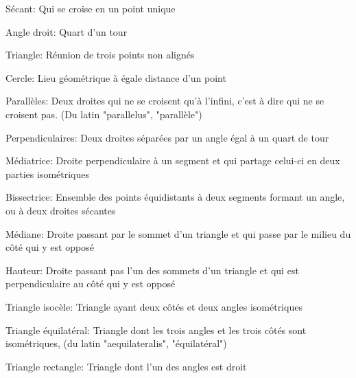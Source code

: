 \begin{definition}{Sécant:}
Qui se croise en un point unique
\end{definition}

\begin{definition}{Angle droit:}
Quart d'un tour
\end{definition}

\begin{definition}{Triangle:}
Réunion de trois points non alignés
\end{definition}

\begin{definition}{Cercle: }
Lieu géométrique à égale distance d'un point
\end{definition}

\begin{definition}{Parallèles:}
Deux droites qui ne se croisent qu'à l'infini, c'est à dire qui ne se croisent pas. (Du latin "parallelus", "parallèle")
\end{definition}

\begin{definition}{Perpendiculaires:}
Deux droites séparées par un angle égal à un quart de tour
\end{definition}

\begin{definition}{Médiatrice:}\label{def:mediatrice}
Droite perpendiculaire à un segment et qui partage celui-ci en deux parties isométriques
\end{definition}

\begin{definition}{Bissectrice:}
Ensemble des points équidistants à deux segments formant un angle, ou à deux droites sécantes
\end{definition}

\begin{definition}{Médiane:}
Droite passant par le sommet d'un triangle et qui passe par le milieu du côté qui y est opposé
\end{definition}

\begin{definition}{Hauteur:}
Droite passant pas l'un des sommets d'un triangle et qui est perpendiculaire au côté qui y est opposé
\end{definition}

\begin{definition}{Triangle isocèle:}
Triangle ayant deux côtés et deux angles isométriques
\end{definition}

\begin{definition}{Triangle équilatéral:}
Triangle dont les trois angles et les trois côtés sont isométriques, (du latin "aequilateralis", "équilatéral")
\end{definition}

\begin{definition}{Triangle rectangle:}
Triangle dont l'un des angles est droit
\end{definition}

%